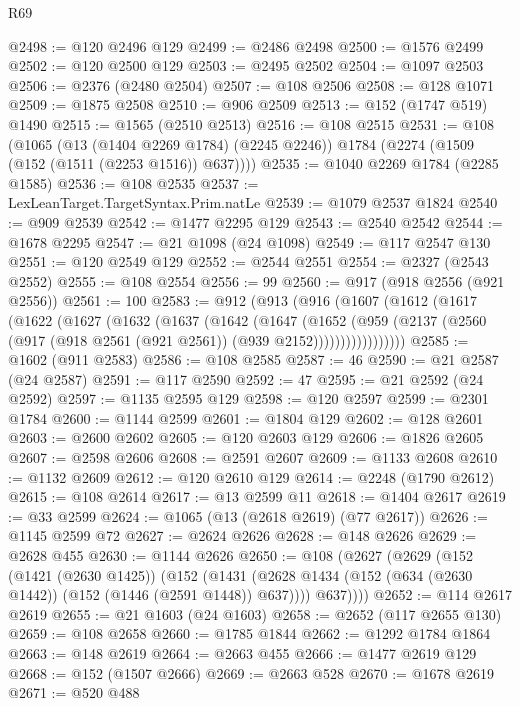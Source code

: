 \begin{lexlean}{R69}
\begin{coremodule}
@2498 := @120 @2496 @129
@2499 := @2486 @2498
@2500 := @1576 @2499
@2502 := @120 @2500 @129
@2503 := @2495 @2502
@2504 := @1097 @2503
@2506 := @2376 (@2480 @2504)
@2507 := @108 @2506
@2508 := @128 @1071
@2509 := @1875 @2508
@2510 := @906 @2509
@2513 := @152 (@1747 @519) @1490
@2515 := @1565 (@2510 @2513)
@2516 := @108 @2515
@2531 := @108
    (@1065
      (@13 (@1404 @2269 @1784) (@2245 @2246))
      @1784
      (@2274 (@1509 (@152 (@1511 (@2253 @1516)) @637))))
@2535 := @1040 @2269 @1784 (@2285 @1585)
@2536 := @108 @2535
@2537 := LexLeanTarget.TargetSyntax.Prim.natLe
@2539 := @1079 @2537 @1824
@2540 := @909 @2539
@2542 := @1477 @2295 @129
@2543 := @2540 @2542
@2544 := @1678 @2295
@2547 := @21 @1098 (@24 @1098)
@2549 := @117 @2547 @130
@2551 := @120 @2549 @129
@2552 := @2544 @2551
@2554 := @2327 (@2543 @2552)
@2555 := @108 @2554
@2556 := 99
@2560 := @917 (@918 @2556 (@921 @2556))
@2561 := 100
@2583 := @912
    (@913
      (@916
        (@1607
          (@1612
            (@1617
              (@1622
                (@1627
                  (@1632
                    (@1637
                      (@1642
                        (@1647
                          (@1652
                            (@959
                              (@2137
                                (@2560 (@917 (@918 @2561 (@921 @2561)) (@939 @2152)))))))))))))))))
@2585 := @1602 (@911 @2583)
@2586 := @108 @2585
@2587 := 46
@2590 := @21 @2587 (@24 @2587)
@2591 := @117 @2590
@2592 := 47
@2595 := @21 @2592 (@24 @2592)
@2597 := @1135 @2595 @129
@2598 := @120 @2597
@2599 := @2301 @1784
@2600 := @1144 @2599
@2601 := @1804 @129
@2602 := @128 @2601
@2603 := @2600 @2602
@2605 := @120 @2603 @129
@2606 := @1826 @2605
@2607 := @2598 @2606
@2608 := @2591 @2607
@2609 := @1133 @2608
@2610 := @1132 @2609
@2612 := @120 @2610 @129
@2614 := @2248 (@1790 @2612)
@2615 := @108 @2614
@2617 := @13 @2599 @11
@2618 := @1404 @2617
@2619 := @33 @2599
@2624 := @1065 (@13 (@2618 @2619) (@77 @2617))
@2626 := @1145 @2599 @72
@2627 := @2624 @2626
@2628 := @148 @2626
@2629 := @2628 @455
@2630 := @1144 @2626
@2650 := @108
    (@2627
      (@2629
        (@152
          (@1421 (@2630 @1425))
          (@152
            (@1431 (@2628 @1434 (@152 (@634 (@2630 @1442)) (@152 (@1446 (@2591 @1448)) @637))))
            @637))))
@2652 := @114 @2617 @2619
@2655 := @21 @1603 (@24 @1603)
@2658 := @2652 (@117 @2655 @130)
@2659 := @108 @2658
@2660 := @1785 @1844
@2662 := @1292 @1784 @1864
@2663 := @148 @2619
@2664 := @2663 @455
@2666 := @1477 @2619 @129
@2668 := @152 (@1507 @2666)
@2669 := @2663 @528
@2670 := @1678 @2619
@2671 := @520 @488

\end{coremodule}
\end{lexlean}
